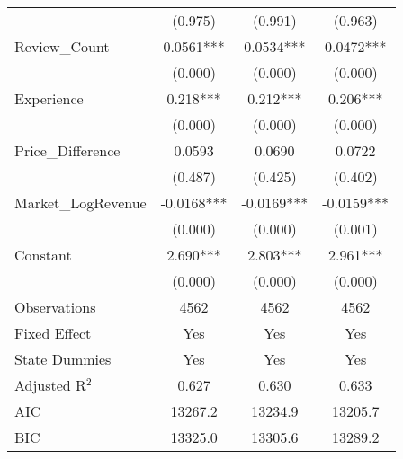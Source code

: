 \begin{table}[]
\begin{threeparttable}
\begin{tabular}{@{}lccc@{}}
                                                     & (0.975)                    & (0.991)                    & (0.963)                    \\
Review\_Count                                        & 0.0561***                  & 0.0534***                  & 0.0472***                  \\
                                                     & (0.000)                    & (0.000)                    & (0.000)                    \\
Experience                                           & 0.218***                   & 0.212***                   & 0.206***                   \\
                                                     & (0.000)                    & (0.000)                    & (0.000)                    \\
Price\_Difference                                    & 0.0593                     & 0.0690                     & 0.0722                     \\
                                                     & (0.487)                    & (0.425)                    & (0.402)                    \\
Market\_LogRevenue                                   & -0.0168***                 & -0.0169***                 & -0.0159***                 \\
                                                     & (0.000)                    & (0.000)                    & (0.001)                    \\
Constant                                             & 2.690***                   & 2.803***                   & 2.961***                   \\
                                                     & (0.000)                    & (0.000)                    & (0.000)                    \\
Observations                                         & 4562                       & 4562                       & 4562                       \\
Fixed Effect                             & Yes        & Yes        & Yes       \\
State Dummies                            & Yes        & Yes        & Yes       \\
Adjusted R$^2$                                                     & 0.627                      & 0.630                      & 0.633       \\
AIC                                                  & 13267.2                    & 13234.9                    & 13205.7                    \\
BIC                                                  & 13325.0                    & 13305.6                    & 13289.2                    \\ \bottomrule


\end{tabular}
\end{threeparttable}
\end{table}
